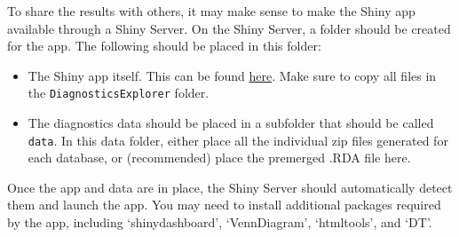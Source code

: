 \documentclass[
]{article}
\begin{document}
To share the results with others, it may make sense to make the Shiny
app available through a Shiny Server. On the Shiny Server, a folder
should be created for the app. The following should be placed in this
folder:

\begin{itemize}
\item
  The Shiny app itself. This can be found
  \href{https://github.com/OHDSI/CohortDiagnostics/tree/master/inst/shiny/DiagnosticsExplorer}{here}.
  Make sure to copy all files in the \texttt{DiagnosticsExplorer}
  folder.
\item
  The diagnostics data should be placed in a subfolder that should be
  called \texttt{data}. In this data folder, either place all the
  individual zip files generated for each database, or (recommended)
  place the premerged .RDA file here.
\end{itemize}

Once the app and data are in place, the Shiny Server should
automatically detect them and launch the app. You may need to install
additional packages required by the app, including `shinydashboard',
`VennDiagram', `htmltools', and `DT'.
\end{document}
